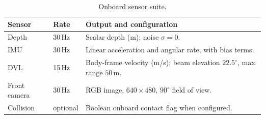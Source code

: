 \begin{table}[t]
\centering
\caption{Onboard sensor suite.}
\label{tab:sensors}
\mratablestyle
\begin{tabular}{p{}p{}p{}}
\toprule
Sensor & Rate & Output and configuration \\
\midrule
Depth        & 30\,Hz & Scalar depth (m); noise $\sigma=0$. \\
IMU          & 30\,Hz & Linear acceleration and angular rate, with bias terms. \\
DVL          & 15\,Hz & Body-frame velocity (m/s); beam elevation $22.5^\circ$, max range $50$\,m. \\
Front camera & 30\,Hz & RGB image, $640\times480$, $90^\circ$ field of view. \\
Collision    & optional & Boolean onboard contact flag when configured. \\
\bottomrule
\end{tabular}
\end{table}
